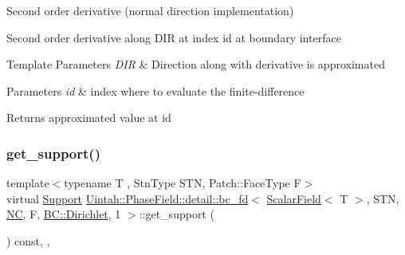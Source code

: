 Second order derivative (normal direction implementation) 

Second order derivative along D\+IR at index id at boundary interface


\begin{DoxyTemplParams}{Template Parameters}
{\em D\+IR} & Direction along with derivative is approximated \\
\hline
\end{DoxyTemplParams}

\begin{DoxyParams}{Parameters}
{\em id} & index where to evaluate the finite-\/difference \\
\hline
\end{DoxyParams}
\begin{DoxyReturn}{Returns}
approximated value at id 
\end{DoxyReturn}
\mbox{\label{classUintah_1_1PhaseField_1_1detail_1_1bc__fd_3_01ScalarField_3_01T_01_4_00_01STN_00_01NC_00_01Fc8a6e28ffa258d282d0a921216b0ed9f_a4731083dea627d5f282b4499e899de94}} 
\subsubsection{\texorpdfstring{get\+\_\+support()}{get\_support()}}
{\footnotesize\ttfamily template$<$typename T , Stn\+Type S\+TN, Patch\+::\+Face\+Type F$>$ \\
virtual \hyperlink{classUintah_1_1PhaseField_1_1Support}{Support} \hyperlink{classUintah_1_1PhaseField_1_1detail_1_1bc__fd}{Uintah\+::\+Phase\+Field\+::detail\+::bc\+\_\+fd}$<$ \hyperlink{structUintah_1_1PhaseField_1_1ScalarField}{Scalar\+Field}$<$ T $>$, S\+TN, \hyperlink{namespaceUintah_1_1PhaseField_a33d355affda78a83f45755ba8388cedda77924170fe82bfd58b74ca3e44139718}{NC}, F, \hyperlink{namespaceUintah_1_1PhaseField_a148fba372aa3be96fd6eede7a2fa10b5abac152b762896edff34ed668ae1a546f}{B\+C\+::\+Dirichlet}, 1 $>$\+::get\+\_\+support (\begin{DoxyParamCaption}{ }\end{DoxyParamCaption}) const\hspace{0.3cm}{\ttfamily [inline]}, {\ttfamily [override]}, {\ttfamily [virtual]}}



